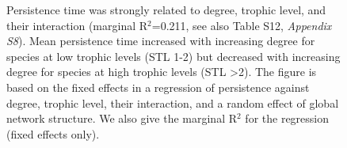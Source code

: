 \documentclass[12pt]{article}
\begin{document}
\clearpage

    \begin{figure}[ht!]
        \centering
        \caption{Persistence time was strongly related to degree, trophic level, and their interaction (marginal R$^2$=0.211, see also Table S12, \emph{Appendix S8}). Mean persistence time increased with increasing degree for species at low trophic levels (STL 1-2) but decreased with increasing degree for species at high trophic levels (STL \textgreater2). The figure is based on the fixed effects in a regression of persistence against degree, trophic level, their interaction, and a random effect of global network structure. We also give the marginal R$^2$ for the regression (fixed effects only).}
        \label{fig:persistence_degTL}
    \end{figure}

\clearpage




    
    
        
    
        
\end{document}
